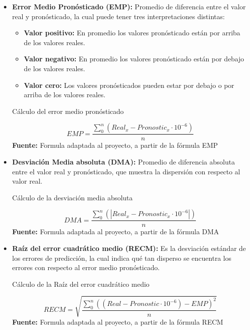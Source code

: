 \begin{itemize}
\item \textbf{Error Medio Pron\'osticado (\acrshort{EMP}):} Promedio de diferencia entre el valor real y pron\'osticado, la cual puede tener tres interpretaciones distintas:
	\begin{itemize}
	\item \textbf{Valor positivo:} En promedio los valores pron\'osticado est\'an por arriba de los valores reales.
	\item \textbf{Valor negativo:} En promedio los valores pron\'osticado est\'an por debajo de los valores reales.
	\item \textbf{Valor cero:} Los valores pron\'osticados pueden estar por debajo o por arriba de los valores reales.
	\end{itemize}
\begin{formula}[H]
	\centering
	\caption{C\'alculo del error medio pron\'osticado}
	\label{frm:empMath}
	\begin{equation}
EMP=\frac{\sum_{0}^{n}(Real_{x}-Pronostic_{x}\cdot10^{-6})}{n}
	\end{equation}
	\textbf{Fuente:} Formula adaptada al proyecto, a partir de la f\'ormula EMP \cite{videoErrores}
\end{formula}  
\item \textbf{Desviaci\'on Media absoluta (\acrshort{DMA}):} Promedio de diferencia absoluta entre el valor real y pron\'osticado, que muestra la dispersi\'on con respecto al valor real.
 \begin{formula}[H]
	\centering
	\caption{C\'alculo de la desviaci\'on media absoluta}
	\label{frm:MADMath}
	\begin{equation}
DMA=\frac{\sum_{0}^{n}( \left |  Real_{x}-Pronostic_{x}\cdot10^{-6} \right |)}{n}
	\end{equation}
	\textbf{Fuente:} Formula adaptada al proyecto, a partir de la f\'ormula DMA \cite{videoErrores}
\end{formula}  
\item \textbf{Ra\'iz del error cuadr\'atico medio (RECM):} Es la desviaci\'on est\'andar de los errores de predicci\'on, la cual indica qu\'e tan disperso se encuentra los errores con respecto al error medio pron\'osticado.
 \begin{formula}[H]
	\centering
	\caption{C\'alculo de la Ra\'iz del error cuadr\'atico medio}
	\label{frm:RECMMath}
	\begin{equation}
RECM=\sqrt{\frac{\sum_{0}^{n}((Real-Pronostic\cdot10^{-6})-EMP)^{2}}{n}}
	\end{equation}
	\textbf{Fuente:} Formula adaptada al proyecto, a partir de la f\'ormula RECM \cite{GEORCMETUT}
\end{formula}  
\end{itemize}
